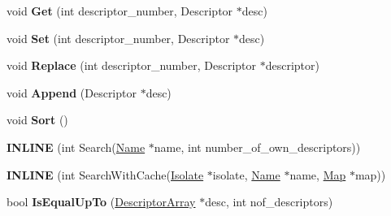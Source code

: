 \begin{DoxyCompactItemize}
\item 
void {\bfseries Get} (int descriptor\+\_\+number, Descriptor $\ast$desc)\hypertarget{classv8_1_1internal_1_1_descriptor_array_a7e737fcd90f03235f423623c9fdf1ce7}{}\label{classv8_1_1internal_1_1_descriptor_array_a7e737fcd90f03235f423623c9fdf1ce7}

\item 
void {\bfseries Set} (int descriptor\+\_\+number, Descriptor $\ast$desc)\hypertarget{classv8_1_1internal_1_1_descriptor_array_a950665afb85bdb2fb375e0ea684fc2e2}{}\label{classv8_1_1internal_1_1_descriptor_array_a950665afb85bdb2fb375e0ea684fc2e2}

\item 
void {\bfseries Replace} (int descriptor\+\_\+number, Descriptor $\ast$descriptor)\hypertarget{classv8_1_1internal_1_1_descriptor_array_a077c7152dd11617df87f9b272b70a97c}{}\label{classv8_1_1internal_1_1_descriptor_array_a077c7152dd11617df87f9b272b70a97c}

\item 
void {\bfseries Append} (Descriptor $\ast$desc)\hypertarget{classv8_1_1internal_1_1_descriptor_array_aca6d89b775bf9bf687ba9a654521eb49}{}\label{classv8_1_1internal_1_1_descriptor_array_aca6d89b775bf9bf687ba9a654521eb49}

\item 
void {\bfseries Sort} ()\hypertarget{classv8_1_1internal_1_1_descriptor_array_a5ef83bcfde45529ee36e444ed17e4dde}{}\label{classv8_1_1internal_1_1_descriptor_array_a5ef83bcfde45529ee36e444ed17e4dde}

\item 
{\bfseries I\+N\+L\+I\+NE} (int Search(\hyperlink{classv8_1_1internal_1_1_name}{Name} $\ast$name, int number\+\_\+of\+\_\+own\+\_\+descriptors))\hypertarget{classv8_1_1internal_1_1_descriptor_array_a3d925fe807d8d30295cacb2f0c83d851}{}\label{classv8_1_1internal_1_1_descriptor_array_a3d925fe807d8d30295cacb2f0c83d851}

\item 
{\bfseries I\+N\+L\+I\+NE} (int Search\+With\+Cache(\hyperlink{classv8_1_1internal_1_1_isolate}{Isolate} $\ast$isolate, \hyperlink{classv8_1_1internal_1_1_name}{Name} $\ast$name, \hyperlink{classv8_1_1internal_1_1_map}{Map} $\ast$map))\hypertarget{classv8_1_1internal_1_1_descriptor_array_a70ea89ca8f0f218a51ac44334e18ae28}{}\label{classv8_1_1internal_1_1_descriptor_array_a70ea89ca8f0f218a51ac44334e18ae28}

\item 
bool {\bfseries Is\+Equal\+Up\+To} (\hyperlink{classv8_1_1internal_1_1_descriptor_array}{Descriptor\+Array} $\ast$desc, int nof\+\_\+descriptors)\hypertarget{classv8_1_1internal_1_1_descriptor_array_a7874bd340f3d921469008c12b18e4e62}{}\label{classv8_1_1internal_1_1_descriptor_array_a7874bd340f3d921469008c12b18e4e62}

\end{DoxyCompactItemize}
